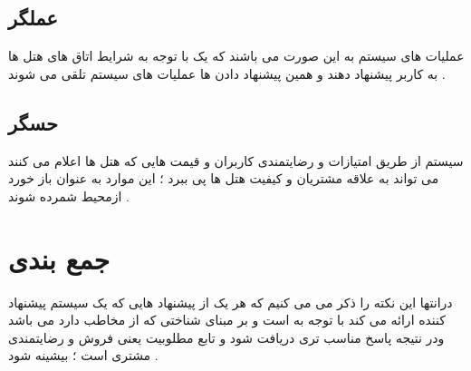 \subsection{عملگر}
عملیات های سیستم به این صورت می باشند که یک با توجه به شرایط اتاق های هتل ها به کاربر پیشنهاد دهند و همین پیشنهاد دادن ها عملیات های سیستم تلقی می شوند .
\subsection{حسگر}
سیستم از طریق امتیازات و رضایتمندی کاربران و قیمت هایی که هتل ها اعلام می کنند می تواند به علاقه مشتریان و کیفیت هتل ها پی ببرد ؛ این موارد به عنوان باز خورد ازمحیط شمرده شوند .
\section{جمع بندی}
درانتها این نکته را ذکر می می کنیم که هر یک از پیشنهاد هایی که یک سیستم پیشنهاد کننده ارائه می کند با توجه به 
است و بر مبنای شناختی که از مخاطب دارد می باشد ودر نتیجه  پاسخ مناسب تری دریافت شود و تابع مطلوبیت یعنی فروش و رضایتمندی مشتری است ؛ بیشینه شود .

